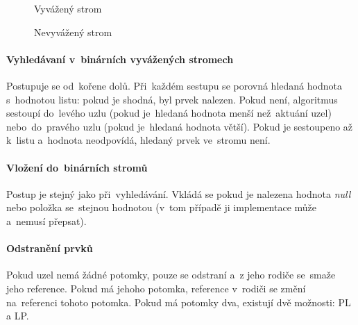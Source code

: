 \begin{figure}[ht]
	\begin{minipage}[b]{0.47\textwidth}
		\centering
		\caption{Vyvážený strom}
		\label{even_binary_tree}
 	\end{minipage}
	\hspace*{1em}%
 	\begin{minipage}[b]{0.47\textwidth}
 		\centering
		\caption{Nevyvážený strom}
		\label{noneven_binary_tree}
	\end{minipage}
\end{figure}

\paragraph{Vyhledávaní v~binárních vyvážených stromech} Postupuje se od~kořene dolů. Při~každém sestupu se porovná hledaná hodnota s~hodnotou listu: pokud je shodná, byl prvek nalezen. Pokud není, algoritmus sestoupí do~levého uzlu (pokud je~hledaná hodnota menší než~aktuání uzel) nebo~do~pravého uzlu (pokud je~hledaná hodnota větší). Pokud je sestoupeno až k~listu a~hodnota neodpovídá, hledaný prvek ve~stromu není.

\paragraph{Vložení do~binárních stromů} Postup je stejný jako při~vyhledávání. Vkládá se pokud je nalezena hodnota \emph{null} nebo položka se~stejnou hodnotou (v~tom případě ji implementace může a~nemusí přepsat).

\paragraph{Odstranění prvků} Pokud uzel nemá žádné potomky, pouze se odstraní a~z jeho rodiče se~smaže jeho reference. Pokud má jehoho potomka, reference v~rodiči se změní na~referenci tohoto potomka. Pokud má potomky dva, existují dvě možnosti: PL a LP.

